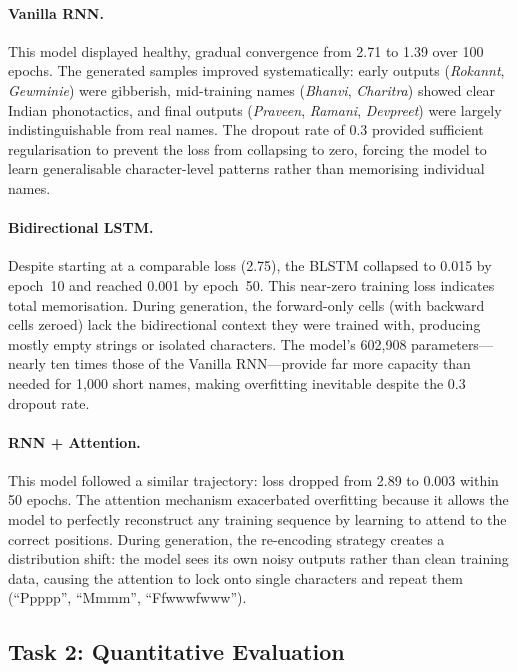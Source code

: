 \documentclass[12pt, a4paper]{article}
\begin{document}
\paragraph{Vanilla RNN.} This model displayed healthy, gradual convergence from 2.71 to 1.39 over 100 epochs. The generated samples improved systematically: early outputs (\emph{Rokannt}, \emph{Gewminie}) were gibberish, mid-training names (\emph{Bhanvi}, \emph{Charitra}) showed clear Indian phonotactics, and final outputs (\emph{Praveen}, \emph{Ramani}, \emph{Devpreet}) were largely indistinguishable from real names. The dropout rate of 0.3 provided sufficient regularisation to prevent the loss from collapsing to zero, forcing the model to learn generalisable character-level patterns rather than memorising individual names.

\paragraph{Bidirectional LSTM.} Despite starting at a comparable loss (2.75), the BLSTM collapsed to 0.015 by epoch~10 and reached 0.001 by epoch~50. This near-zero training loss indicates total memorisation. During generation, the forward-only cells (with backward cells zeroed) lack the bidirectional context they were trained with, producing mostly empty strings or isolated characters. The model's 602,908 parameters---nearly ten times those of the Vanilla RNN---provide far more capacity than needed for 1,000 short names, making overfitting inevitable despite the 0.3 dropout rate.

\paragraph{RNN + Attention.} This model followed a similar trajectory: loss dropped from 2.89 to 0.003 within 50 epochs. The attention mechanism exacerbated overfitting because it allows the model to perfectly reconstruct any training sequence by learning to attend to the correct positions. During generation, the re-encoding strategy creates a distribution shift: the model sees its own noisy outputs rather than clean training data, causing the attention to lock onto single characters and repeat them (``Ppppp'', ``Mmmm'', ``Ffwwwfwww'').

\subsection{Task 2: Quantitative Evaluation}
\end{document}
